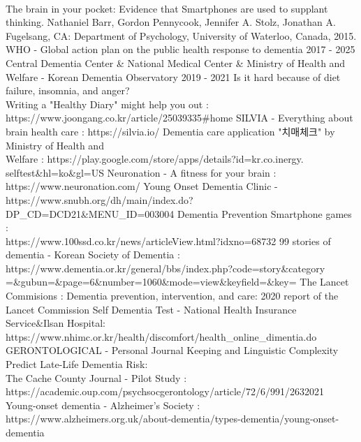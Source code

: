 \documentclass[conference]{IEEEtran}
\begin{document}
\\
\begin{thebibliography}{00}
 The brain in your pocket: Evidence that Smartphones
are used to supplant thinking. Nathaniel Barr, Gordon Pennycook, Jennifer A. Stolz, Jonathan A. Fugelsang, CA: Department of Psychology, University of Waterloo, Canada, 2015.
 WHO - Global action plan on the public health response to dementia 2017 - 2025 
 Central Dementia Center \& National Medical Center \& Ministry of Health and Welfare - Korean Dementia Observatory 2019 - 2021
 Is it hard because of diet failure, insomnia, and anger? \\Writing a "Healthy Diary" might help you out :\\ https://www.joongang.co.kr/article/25039335\#home
 SILVIA - Everything about brain health care : https://silvia.io/
 Dementia care application "치매체크" by Ministry of Health and\\ Welfare : https://play.google.com/store/apps/details?id=kr.co.inergy.\\selftest\&hl=ko\&gl=US
 Neuronation - A fitness for your brain : https://www.neuronation.com/
 Young Onset Dementia Clinic - https://www.snubh.org/dh/main/index.do?\\DP\_CD=DCD21\&MENU\_ID=003004
 Dementia Prevention Smartphone games :\\https://www.100ssd.co.kr/news/articleView.html?idxno=68732
 99 stories of dementia - Korean Society of Dementia :\\https://www.dementia.or.kr/general/bbs/index.php?code=story\&category\\=\&gubun=\&page=6\&number=1060\&mode=view\&keyfield=\&key=
 The Lancet Commisions : Dementia prevention, intervention, and care: 2020 report of the Lancet Commission
 Self Dementia Test - National Health Insurance Service\&Ilsan Hospital:\\https://www.nhimc.or.kr/health/discomfort/health\_online\_dimentia.do
 GERONTOLOGICAL - Personal Journal Keeping and Linguistic Complexity Predict Late-Life Dementia Risk:\\ The Cache County Journal - Pilot Study :\\ https://academic.oup.com/psychsocgerontology/article/72/6/991/2632021
 Young-onset dementia - Alzheimer's Society :\\https://www.alzheimers.org.uk/about-dementia/types-dementia/young-onset-dementia

\end{thebibliography}
\end{document}
